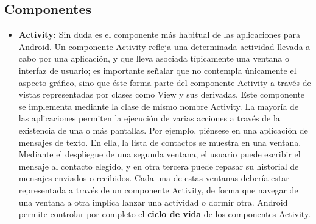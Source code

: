 \documentclass[letterpaper,12pt,openany,oneside]{book}
\begin{document}
\subsection{Componentes}
\begin{itemize}
\item \textbf{Activity: }Sin duda es el componente más habitual de las aplicaciones para Android. Un componente Activity refleja una determinada actividad llevada a cabo por una aplicación, y que lleva asociada típicamente una ventana o interfaz de usuario; es importante señalar que no contempla únicamente el aspecto gráfico, sino que éste forma parte del componente Activity a través de vistas representadas por clases como View y sus derivadas. Este componente se implementa mediante la clase de mismo nombre Activity. La mayoría de las aplicaciones permiten la ejecución de varias acciones a través de la existencia de una o más pantallas. Por ejemplo, piénsese en una aplicación de mensajes de texto. En ella, la lista de contactos se muestra en una ventana. Mediante el despliegue de una segunda ventana, el usuario puede escribir el mensaje al contacto elegido, y en otra tercera puede repasar su historial de mensajes enviados o recibidos. Cada una de estas ventanas debería estar representada a través de un componente Activity, de forma que navegar de una ventana a otra implica lanzar una actividad o dormir otra. Android permite controlar por completo el \textbf{ciclo de vida} de los componentes Activity. 


\end{itemize}
\end{document}
